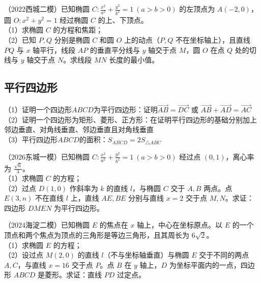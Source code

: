 \begin{example} %
（2022西城二模）已知椭圆 $C:\frac{x^2}{a^2}+\frac{y^2}{b^2}=1\ (a>b>0)$ 的左顶点为 $A(-2,0)$，圆 $O:x^2+y^2=1$ 经过椭圆 $C$ 的上、下顶点。\\
（1）求椭圆 $C$ 的方程和焦距；\\
（2）已知 $P,Q$ 分别是椭圆 $C$ 和圆 $O$ 上的动点（$P,Q$ 不在坐标轴上），且直线 $PQ$ 与 $x$ 轴平行，线段 $AP$ 的垂直平分线与 $y$ 轴交于点 $M$，圆 $O$ 在点 $Q$ 处的切线与 $y$ 轴交于点 $N$。求线段 $MN$ 长度的最小值。
\end{example}



\subsection{平行四边形}
\noindent（1）证明一个四边形$ABCD$为平行四边形：证明$\overrightarrow{AB} = \overrightarrow{DC} \text{ 或 } \overrightarrow{AB} + \overrightarrow{AD} = \overrightarrow{AC}$\\
（2）证明一个四边形为矩形、菱形、正方形：在证明平行四边形的基础分别加上邻边垂直、对角线垂直、邻边垂直且对角线垂直\\
（3）平行四边形$ABCD$的面积：$S_{ABCD} = 2 S_{\triangle ABC}$


\begin{example} %
（2026东城一模）已知椭圆 $C:\frac{x^2}{a^2}+\frac{y^2}{b^2}=1\ (a>b>0)$ 经过点 $(0,1)$，离心率为 $\frac{\sqrt{6}}{3}$。\\
（1）求椭圆 $C$ 的方程；\\
（2）过点 $D(1,0)$ 作斜率为 $k$ 的直线 $l$，与椭圆 $C$ 交于 $A,B$ 两点。点 $E(3,n)$ 不在直线 $l$ 上，直线 $AE,BE$ 分别与直线 $x=2$ 交于点 $M,N$。求证：四边形 $DMEN$ 为平行四边形。
\end{example}



\begin{example} %
（2024海淀二模）已知椭圆 $E$ 的焦点在 $x$ 轴上，中心在坐标原点。以 $E$ 的一个顶点和两个焦点为顶点的三角形是等边三角形，且其周长为 $6\sqrt{2}$。\\
（1）求椭圆 $E$ 的方程；\\
（2）设过点 $M(2,0)$ 的直线 $l$（不与坐标轴垂直）与椭圆 $E$ 交于不同的两点 $A,C$，与直线 $x=16$ 交于点 $P$。点 $B$ 在 $y$ 轴上，$D$ 为坐标平面内的一点，四边形 $ABCD$ 是菱形。求证：直线 $PD$ 过定点。
\end{example}

